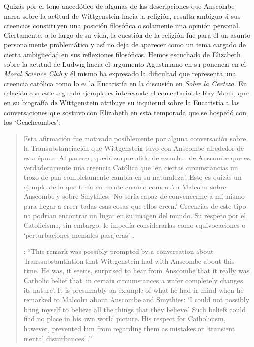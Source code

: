  Quizás por el tono anecdótico de algunas de las descripciones que Anscombe narra sobre la actitud de Wittgenstein hacia la religión, resulta ambiguo si sus creencias constituyen una posición filosófica o solamente una opinión personal. Ciertamente, a lo largo de su vida, la cuestión de la religión fue para él un asunto personalmente problemático y así no deja de aparecer como un tema cargado de cierta ambigüedad en sus reflexiones filosóficas. Hemos escuchado de Elizabeth sobre la actitud de Ludwig hacia el argumento Agustiniano en su ponencia en el \emph{Moral Science Club} y él mismo ha expresado la dificultad que representa una creencia católica como lo es la Eucaristía en la discusión en \emph{Sobre la Certeza}. En relación con este segundo ejemplo es interesante el comentario de Ray Monk, que en su biografía de Wittgenstein atribuye su inquietud sobre la Eucaristía a las conversaciones que sostuvo con Elizabeth en esta temporada que se hospedó con los `Geachcombes': \blockquote[{\cite[572]{monk1991duty}}: \enquote{This remark  was possibly prompted by a conversation about Transsubstantiation  that Wittgenstein had with Anscombe about this time. He was, it seems, surprised to hear from Anscombe that it really was Catholic belief that ‘in certain circumstances a wafer completely changes its nature’. It is presumably an example of what he had in mind when he remarked to Malcolm about Anscombe and Smythies: ‘I could not possibly bring myself to believe all the things that they believe.’ Such beliefs could find no place in his own world picture. His respect for Catholicism, however, prevented him from regarding them as mistakes or ‘transient mental disturbances’ .}]{Esta afirmación  fue motivada posiblemente por alguna conversación sobre la Transubstanciación que Wittgenstein tuvo con Anscombe alrededor de esta época. Al parecer, quedó sorprendido de escuchar de Anscombe que es verdaderamente una creencia Católica que `en ciertas circunstancias un trozo de pan completamente cambia en su naturaleza'. Esto es quizás un ejemplo de lo que tenía en mente cuando comentó a Malcolm sobre Anscombe y sobre Smythies: `No sería capaz de convencerme a mí mismo para llegar a creer todas esas cosas que ellos creen.' Creencias de este tipo no podrían encontrar un lugar en su imagen del mundo. Su respeto por el Catolicismo, sin embargo, le impedía considerarlas como equivocaciones o `perturbaciones mentales pasajeras' .}

